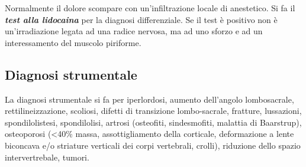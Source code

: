  
Normalmente il dolore scompare con un'infiltrazione locale di
anestetico. Si fa il \emph{\textbf{\emph{test alla lidocaina}}} per la
diagnosi differenziale. Se il test è positivo non è un'irradiazione
legata ad una radice nervosa, ma ad uno sforzo e ad un interessamento
del muscolo piriforme.
 

\subsection{Diagnosi strumentale}


La diagnosi strumentale si fa per iperlordosi, aumento dell'angolo
lombosacrale, rettilineizzazione, scoliosi, difetti di transizione
lombo-sacrale, fratture, lussazioni, spondilolistesi, spondilolisi,
artrosi (osteofiti, sindesmofiti, malattia di Baarstrup), osteoporosi
(\textless{}40\% massa, assottigliamento della corticale, deformazione a
lente biconcava e/o striature verticali dei corpi vertebrali, crolli),
riduzione dello spazio intervertrebale, tumori.

